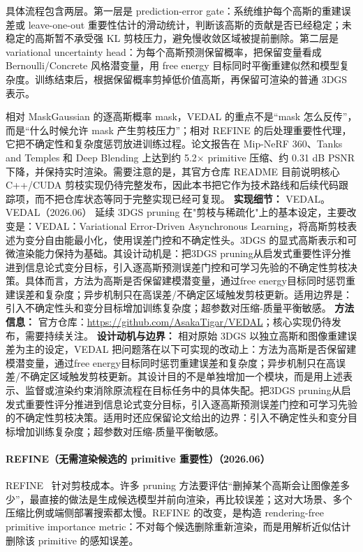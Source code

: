 具体流程包含两层。第一层是 prediction-error gate：系统维护每个高斯的重建误差或 leave-one-out 重要性估计的滑动统计，判断该高斯的贡献是否已经稳定；未稳定的高斯暂不承受强 KL 剪枝压力，避免慢收敛区域被提前删除。第二层是 variational uncertainty head：为每个高斯预测保留概率，把保留变量看成 Bernoulli/Concrete 风格潜变量，用 free energy 目标同时平衡重建似然和模型复杂度。训练结束后，根据保留概率剪掉低价值高斯，再保留可渲染的普通 3DGS 表示。

相对 MaskGaussian 的逐高斯概率 mask，VEDAL 的重点不是“mask 怎么反传”，而是“什么时候允许 mask 产生剪枝压力”；相对 REFINE 的后处理重要性代理，它把不确定性和复杂度惩罚放进训练过程。论文报告在 Mip-NeRF 360、Tanks and Temples 和 Deep Blending 上达到约 5.2$\times$ primitive 压缩、约 0.31 dB PSNR 下降，并保持实时渲染。需要注意的是，其官方仓库 README 目前说明核心 C++/CUDA 剪枝实现仍待完整发布，因此本书把它作为技术路线和后续代码跟踪项，而不把仓库状态等同于完整实现已经可复现。
\textbf{实现细节：} VEDAL。VEDAL（2026.06） 延续 3DGS pruning 在"剪枝与稀疏化"上的基本设定，主要改变是：VEDAL：Variational Error-Driven Asynchronous Learning，将高斯剪枝表述为变分自由能最小化，使用误差门控和不确定性头。3DGS 的显式高斯表示和可微渲染能力保持为基础。其设计动机是：把3DGS pruning从启发式重要性评分推进到信息论式变分目标，引入逐高斯预测误差门控和可学习先验的不确定性剪枝决策。具体而言，方法为高斯是否保留建模潜变量，通过free energy目标同时惩罚重建误差和复杂度；异步机制只在高误差/不确定区域触发剪枝更新。适用边界是：引入不确定性头和变分目标增加训练复杂度；超参数对压缩-质量平衡敏感。
\textbf{方法信息：} 官方仓库：\url{https://github.com/AsakaTigar/VEDAL}；核心实现仍待发布，需要持续关注。
\textbf{设计动机与边界：} 相对原始 3DGS 以独立高斯和图像重建误差为主的设定，VEDAL 把问题落在以下可实现的改动上：方法为高斯是否保留建模潜变量，通过free energy目标同时惩罚重建误差和复杂度；异步机制只在高误差/不确定区域触发剪枝更新。其设计目的不是单独增加一个模块，而是用上述表示、监督或渲染约束消除原流程在目标任务中的具体失配。把3DGS pruning从启发式重要性评分推进到信息论式变分目标，引入逐高斯预测误差门控和可学习先验的不确定性剪枝决策。适用时还应保留论文给出的边界：引入不确定性头和变分目标增加训练复杂度；超参数对压缩-质量平衡敏感。
\paragraph{REFINE（无需渲染候选的 primitive 重要性）（2026.06）}
REFINE~\cite{2606_09074} 针对剪枝成本。许多 pruning 方法要评估“删掉某个高斯会让图像差多少”，最直接的做法是生成候选模型并前向渲染，再比较误差；这对大场景、多个压缩比例或端侧部署搜索都太慢。REFINE 的改变，是构造 rendering-free primitive importance metric：不对每个候选删除重新渲染，而是用解析近似估计删除该 primitive 的感知误差。

